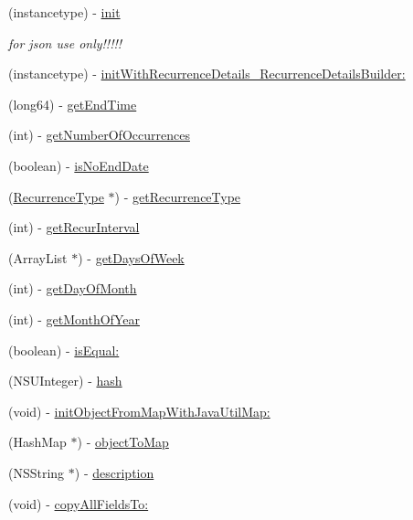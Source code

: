 \begin{DoxyCompactItemize}
\item 
(instancetype) -\/ \hyperlink{interface_recurrence_details_a8cd6bd40f4330b924148cd4f44401b9d}{init}
\begin{DoxyCompactList}\small\item\em for json use only!!!!! \end{DoxyCompactList}\item 
(instancetype) -\/ \hyperlink{interface_recurrence_details_af57f2b9212cadde1451d0c8449b66160}{init\+With\+Recurrence\+Details\+\_\+\+Recurrence\+Details\+Builder\+:}
\item 
(long64) -\/ \hyperlink{interface_recurrence_details_a1c6a2d7cf072d08814bc8fbad9e39c8f}{get\+End\+Time}
\item 
(int) -\/ \hyperlink{interface_recurrence_details_a17bb3971f727767bafe6ba05199e2bfb}{get\+Number\+Of\+Occurrences}
\item 
(boolean) -\/ \hyperlink{interface_recurrence_details_a04a025767f6c73fe0a29bd6ce7f7b46d}{is\+No\+End\+Date}
\item 
(\hyperlink{interface_recurrence_type}{Recurrence\+Type} $\ast$) -\/ \hyperlink{interface_recurrence_details_a033fbedb1c72228902908d121eec4ed2}{get\+Recurrence\+Type}
\item 
(int) -\/ \hyperlink{interface_recurrence_details_a219d9187639f12befcea260cb1c017fa}{get\+Recur\+Interval}
\item 
(Array\+List $\ast$) -\/ \hyperlink{interface_recurrence_details_acc1a8536c68bed3de7531d8f6ec7fc35}{get\+Days\+Of\+Week}
\item 
(int) -\/ \hyperlink{interface_recurrence_details_ad6089d21648f89ca4f3159a8da9b2597}{get\+Day\+Of\+Month}
\item 
(int) -\/ \hyperlink{interface_recurrence_details_a9c8ebe5cfe7fd5fd3aef9f9d6ce2d979}{get\+Month\+Of\+Year}
\item 
(boolean) -\/ \hyperlink{interface_recurrence_details_ac96bff599c8f626d0e45ed52b9712702}{is\+Equal\+:}
\item 
(N\+S\+U\+Integer) -\/ \hyperlink{interface_recurrence_details_a0bffa00620e97d8098b021c79d3edf84}{hash}
\item 
(void) -\/ \hyperlink{interface_recurrence_details_a94884c290aaf6e757a84d95d704c4035}{init\+Object\+From\+Map\+With\+Java\+Util\+Map\+:}
\item 
(Hash\+Map $\ast$) -\/ \hyperlink{interface_recurrence_details_a43cbad42fc5c9b293065b9ece176397c}{object\+To\+Map}
\item 
(N\+S\+String $\ast$) -\/ \hyperlink{interface_recurrence_details_ab2e05a0a84ca442af159dcc6de49aa12}{description}
\item 
(void) -\/ \hyperlink{interface_recurrence_details_aeebcb93fcac3947d9e4774f070248319}{copy\+All\+Fields\+To\+:}
\end{DoxyCompactItemize}
